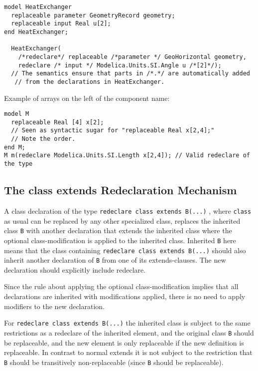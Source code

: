 \begin{nonnormative}
\begin{lstlisting}[language=modelica]
model HeatExchanger
  replaceable parameter GeometryRecord geometry;
  replaceable input Real u[2];
end HeatExchanger;

  HeatExchanger(
    /*redeclare*/ replaceable /*parameter */ GeoHorizontal geometry,
    redeclare /* input */ Modelica.Units.SI.Angle u /*[2]*/);
  // The semantics ensure that parts in /*.*/ are automatically added
   // from the declarations in HeatExchanger.
\end{lstlisting}

Example of arrays on the left of the component name:
\begin{lstlisting}[language=modelica]
model M
  replaceable Real [4] x[2];
  // Seen as syntactic sugar for "replaceable Real x[2,4];"
  // Note the order.
end M;
M m(redeclare Modelica.Units.SI.Length x[2,4]); // Valid redeclare of the type
\end{lstlisting}
\end{nonnormative}

\subsection{The class extends Redeclaration Mechanism}

A class declaration of the type \lstinline!redeclare class extends B(...)! ,
where \lstinline!class! as usual can be replaced by any other specialized class,
replaces the inherited class \lstinline!B! with another declaration that extends the
inherited class where the optional class-modification is applied to the
inherited class.  Inherited \lstinline!B! here means that the class
containing \lstinline!redeclare class extends B(...)! should also inherit
another declaration of \lstinline!B! from one of its extends-clauses. The new
declaration should explicitly include redeclare.

\begin{nonnormative}
Since the rule about applying the optional class-modification implies that all declarations are inherited with modifications applied, there is no need
to apply modifiers to the new declaration.
\end{nonnormative}

For \lstinline!redeclare class extends B(...)! the inherited class is subject
to the same restrictions as a redeclare of the inherited element, and
the original class \lstinline!B! should be replaceable, and the new element is only
replaceable if the new definition is replaceable. In contrast to normal
extends it is not subject to the restriction that \lstinline!B! should be
transitively non-replaceable (since \lstinline!B! should be replaceable).

